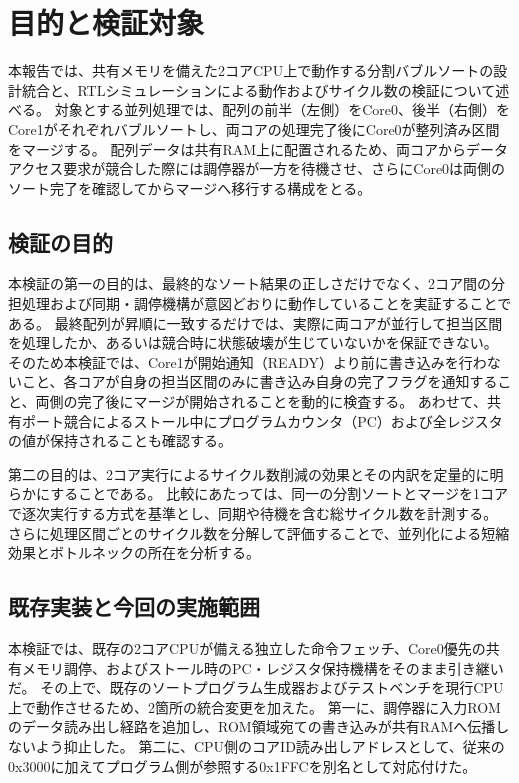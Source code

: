 \chapter{目的と検証対象}\label{chap:1}

本報告では、共有メモリを備えた2コアCPU上で動作する分割バブルソートの設計統合と、RTLシミュレーションによる動作およびサイクル数の検証について述べる。
対象とする並列処理では、配列の前半（左側）をCore0、後半（右側）をCore1がそれぞれバブルソートし、両コアの処理完了後にCore0が整列済み区間をマージする。
配列データは共有RAM上に配置されるため、両コアからデータアクセス要求が競合した際には調停器が一方を待機させ、さらにCore0は両側のソート完了を確認してからマージへ移行する構成をとる。

\section{検証の目的}\label{sec:1-1}

本検証の第一の目的は、最終的なソート結果の正しさだけでなく、2コア間の分担処理および同期・調停機構が意図どおりに動作していることを実証することである。
最終配列が昇順に一致するだけでは、実際に両コアが並行して担当区間を処理したか、あるいは競合時に状態破壊が生じていないかを保証できない。
そのため本検証では、Core1が開始通知（READY）より前に書き込みを行わないこと、各コアが自身の担当区間のみに書き込み自身の完了フラグを通知すること、両側の完了後にマージが開始されることを動的に検査する。
あわせて、共有ポート競合によるストール中にプログラムカウンタ（PC）および全レジスタの値が保持されることも確認する。

第二の目的は、2コア実行によるサイクル数削減の効果とその内訳を定量的に明らかにすることである。
比較にあたっては、同一の分割ソートとマージを1コアで逐次実行する方式を基準とし、同期や待機を含む総サイクル数を計測する。
さらに処理区間ごとのサイクル数を分解して評価することで、並列化による短縮効果とボトルネックの所在を分析する。

\section{既存実装と今回の実施範囲}\label{sec:1-2}

本検証では、既存の2コアCPUが備える独立した命令フェッチ、Core0優先の共有メモリ調停、およびストール時のPC・レジスタ保持機構をそのまま引き継いだ。
その上で、既存のソートプログラム生成器およびテストベンチを現行CPU上で動作させるため、2箇所の統合変更を加えた。
第一に、調停器に入力ROMのデータ読み出し経路を追加し、ROM領域宛ての書き込みが共有RAMへ伝播しないよう抑止した。
第二に、CPU側のコアID読み出しアドレスとして、従来の0x3000に加えてプログラム側が参照する0x1FFCを別名として対応付けた。

